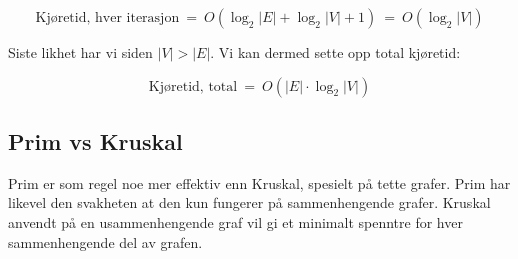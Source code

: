 \[ \text{Kjøretid, hver iterasjon} ~=~ O(\log_2 |E| + \log_2 |V| + 1) ~=~ O(\log_2 |V|) \]

\noindent Siste likhet har vi siden $ |V| > |E| $. Vi kan dermed sette opp total kjøretid:

\[ \text{Kjøretid, total} ~=~ O(|E| \cdot \log_2 |V|) \]



\subsection{Prim vs Kruskal}
Prim er som regel noe mer effektiv enn Kruskal, spesielt på tette grafer. Prim har likevel den svakheten at den kun fungerer på sammenhengende grafer. Kruskal anvendt på en usammenhengende graf vil gi et minimalt spenntre for hver sammenhengende del av grafen.